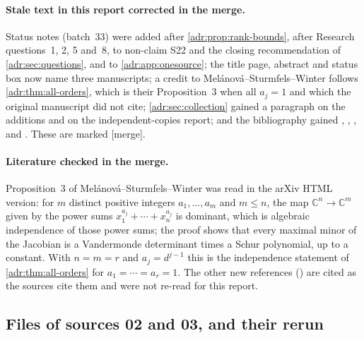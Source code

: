 \documentclass[11pt,letterpaper]{article}
\numberwithin{equation}{section}
\theoremstyle{definition}
\theoremstyle{remark}
\newcommand{\mtag}{\textup{[merge]}}%
\begin{document}
\paragraph{Stale text in this report corrected in the merge.} Status notes
(batch~33) were added after \cref{adr:prop:rank-bounds}, after Research
questions~1, 2, 5 and~8, to non-claim S22 and the closing recommendation of
\cref{adr:sec:questions}, and to \cref{adr:app:onesource}; the title page,
abstract and status box now name three manuscripts; a credit to
Mel\'anov\'a--Sturmfels--Winter follows \cref{adr:thm:all-orders}, which is
their Proposition~3 when all $a_j=1$ and which the original manuscript did not
cite; \cref{adr:sec:collection} gained a paragraph on the additions and on the
independent-copies report; and the bibliography gained \cite{Gonshor},
\cite{Edmonds}, \cite{KM}, \cite{MSW} and \cite{BMS}. These are marked \mtag.

\paragraph{Literature checked in the merge.} Proposition~3 of
Mel\'anov\'a--Sturmfels--Winter was read in the arXiv HTML version: for $m$
distinct positive integers $a_1,\ldots,a_m$ and $m\le n$, the map
$\mathbb C^n\to\mathbb C^m$ given by the power sums
$x_1^{a_j}+\cdots+x_n^{a_j}$ is dominant, which is algebraic independence of
those power sums; the proof shows that every maximal minor of the Jacobian is
a Vandermonde determinant times a Schur polynomial, up to a constant. With
$n=m=r$ and $a_j=d^{j-1}$ this is the independence statement of
\cref{adr:thm:all-orders} for $a_1=\cdots=a_r=1$. The other new references
(\cite{Gonshor,Edmonds,KM,BMS}) are cited as the sources cite them and were
not re-read for this report.

\subsection{Files of sources 02 and 03, and their rerun}\label{adr:sr:app:files}
\end{document}
